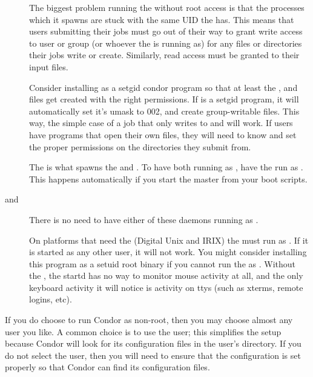 \begin{description}
\item[] The biggest problem running the 
    without root access is that the  processes which it
    spawns are stuck with the same UID the  has.  This
    means that users submitting their jobs must go out of their way
    to grant write access to user or group  (or whoever the
     is running as) for any files or directories their jobs
    write or create.  Similarly, read access must be granted to their
    input files.

    Consider installing  as a setgid condor
    program so that at least the ,  and
     files get created with the right permissions.  If
     is a setgid program, it will automatically set
    it's umask to 002, and create group-writable files.  This
    way, the simple case of a job that only writes to 
    and  will work.  If users have programs that open
    their own files, they will need to know and set the proper permissions
    on the directories they submit from.

\item[] The  is what spawns the
     and . To have both running
    as , have the  run as .
    This happens
    automatically if you start the master from your boot scripts.

\item[ and ]
    There is no need to have either of these daemons running as .

\item[] On platforms that need the  (Digital
    Unix and IRIX) the  must run as .  If it is
    started as any other user, it will not work.  You might consider
    installing this program as a setuid root binary if you cannot run
    the  as .  Without the , the
    startd has no way to monitor mouse activity at all, and the only
    keyboard activity it will notice is activity on ttys (such as
    xterms, remote logins, etc).

\end{description}

If you do choose to run Condor as non-root, then you may choose almost any
user you like. A common choice is to use the  user; this
simplifies the setup because Condor will look for its configuration
files in the  user's directory. If you do not
select the 
user, then you will need to ensure that the configuration is set
properly so that Condor can find its configuration files. 

